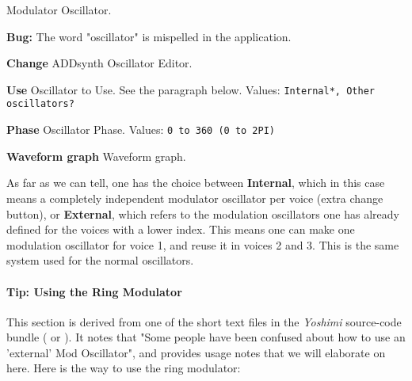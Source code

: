    Modulator Oscillator.

   \textbf{Bug:}
   The word "oscillator" is mispelled in the application.

   \begin{enumber}
      \item \textbf{Change}
         ADDsynth Oscillator Editor.
      \item \textbf{Use}
         Oscillator to Use.
         See the paragraph below.
         Values: \texttt{Internal*, Other oscillators?}
      \item \textbf{Phase}
         Oscillator Phase.
         Values: \texttt{0 to 360 (0 to 2PI)}
      \item \textbf{Waveform graph}
         Waveform graph.
   \end{enumber}

   As far as we can tell, one has the choice between \textbf{Internal},
   which in this case means a completely independent modulator oscillator
   per voice (extra change button), or \textbf{External}, which refers to
   the modulation oscillators one has already defined for the voices with a
   lower index.
   This means one can make one modulation oscillator for voice 1, and reuse it
   in voices 2 and 3.  This is the same system used for the normal
   oscillators.

\paragraph{Tip: Using the Ring Modulator}
\label{paragraph:tips_using_the_ring_modulator}

   This section is derived from one of the short text files in the
   \textsl{Yoshimi} source-code bundle (\cite{yoshimi} or \cite{yoshimi2}).
   It notes that "Some people have
   been confused about how to use an 'external' Mod Oscillator", and
   provides usage notes that we will elaborate on here.  Here is the way to
   use the ring modulator:

